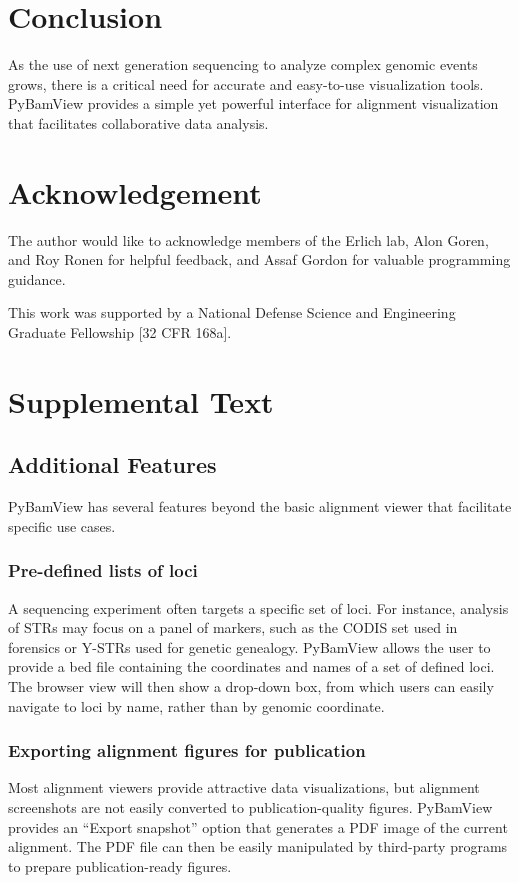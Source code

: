\section{Conclusion}
As the use of next generation sequencing to analyze complex genomic events grows, there is a critical need for accurate and easy-to-use visualization tools. PyBamView provides a simple yet powerful interface for alignment visualization that facilitates collaborative data analysis.

\section{Acknowledgement} 
The author would like to acknowledge members of the Erlich lab, Alon Goren, and Roy Ronen for helpful feedback, and Assaf Gordon for valuable programming guidance.

This work was supported by a National Defense Science and Engineering Graduate Fellowship [32 CFR 168a].

\section{Supplemental Text}
\label{sec:pbvsuptext}
\subsection{Additional Features}
PyBamView has several features beyond the basic alignment viewer that facilitate specific use cases.
\subsubsection{Pre-defined lists of loci}
A sequencing experiment often targets a specific set of loci. For instance, analysis of STRs may focus on a panel of markers, such as the CODIS set used in forensics or Y-STRs used for genetic genealogy. PyBamView allows the user to provide a bed file containing the coordinates and names of a set of defined loci. The browser view will then show a drop-down box, from which users can easily navigate to loci by name, rather than by genomic coordinate.

\subsubsection{Exporting alignment figures for publication}
Most alignment viewers provide attractive data visualizations, but alignment screenshots are not easily converted to publication-quality figures. PyBamView provides an ``Export snapshot'' option that generates a PDF image of the current alignment. The PDF file can then be easily manipulated by third-party programs to prepare publication-ready figures.

